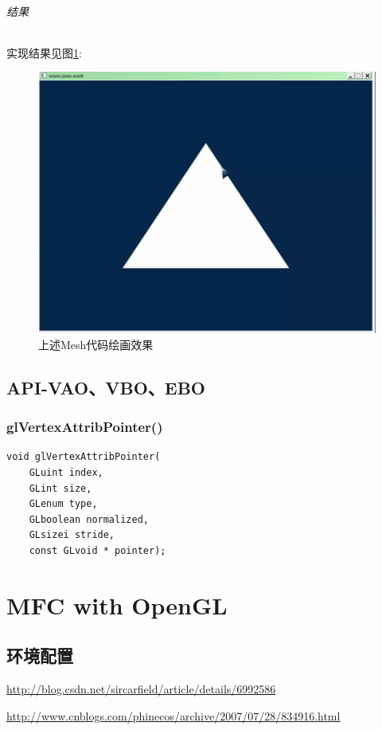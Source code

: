 \documentclass[UTF8,a4paper,12pt]{ctexbook}
\begin{document}
		\subparagraph{结果}
			实现结果见图\ref{VAOResult}:
			\begin{figure}[h]
				\centering
				\includegraphics[scale = 0.5]{VBOMeshResult.png}
				\caption{上述Mesh代码绘画效果}
				\label{VAOResult}
			\end{figure}
	
	
	
	\section{API-VAO、VBO、EBO}
		\subsection{glVertexAttribPointer()}
			\begin{lstlisting}
void glVertexAttribPointer(	
	GLuint index,
 	GLint size,
 	GLenum type,
 	GLboolean normalized,
 	GLsizei stride,
 	const GLvoid * pointer);			
			\end{lstlisting}

			
		

\chapter{MFC with OpenGL}
	\section{环境配置}
		\url{http://blog.csdn.net/sircarfield/article/details/6992586}
		
		\url{http://www.cnblogs.com/phinecos/archive/2007/07/28/834916.html}
		
\end{document}
